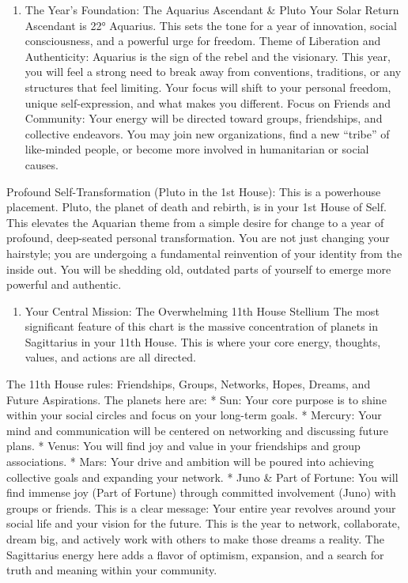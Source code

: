 \documentclass{article}
\begin{document}
\begin{enumerate}
\item
  The Year's Foundation: The Aquarius Ascendant \& Pluto Your Solar Return Ascendant is 22° Aquarius. This sets the tone for a year of innovation, social consciousness, and a powerful urge for freedom. Theme of Liberation and Authenticity: Aquarius is the sign of the rebel and the visionary. This year, you will feel a strong need to break away from conventions, traditions, or any structures that feel limiting. Your focus will shift to your personal freedom, unique self-expression, and what makes you different. Focus on Friends and Community: Your energy will be directed toward groups, friendships, and collective endeavors. You may join new organizations, find a new ``tribe'' of like-minded people, or become more involved in humanitarian or social causes.
\end{enumerate}

Profound Self-Transformation (Pluto in the 1st House): This is a powerhouse placement. Pluto, the planet of death and rebirth, is in your 1st House of Self. This elevates the Aquarian theme from a simple desire for change to a year of profound, deep-seated personal transformation. You are not just changing your hairstyle; you are undergoing a fundamental reinvention of your identity from the inside out. You will be shedding old, outdated parts of yourself to emerge more powerful and authentic.

\begin{enumerate}
\item
  Your Central Mission: The Overwhelming 11th House Stellium The most significant feature of this chart is the massive concentration of planets in Sagittarius in your 11th House. This is where your core energy, thoughts, values, and actions are all directed.
\end{enumerate}

The 11th House rules: Friendships, Groups, Networks, Hopes, Dreams, and Future Aspirations. The planets here are: * Sun: Your core purpose is to shine within your social circles and focus on your long-term goals. * Mercury: Your mind and communication will be centered on networking and discussing future plans. * Venus: You will find joy and value in your friendships and group associations. * Mars: Your drive and ambition will be poured into achieving collective goals and expanding your network. * Juno \& Part of Fortune: You will find immense joy (Part of Fortune) through committed involvement (Juno) with groups or friends. This is a clear message: Your entire year revolves around your social life and your vision for the future. This is the year to network, collaborate, dream big, and actively work with others to make those dreams a reality. The Sagittarius energy here adds a flavor of optimism, expansion, and a search for truth and meaning within your community.
\end{document}
